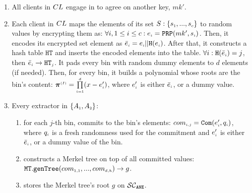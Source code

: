 \begin{enumerate}
\item\label{e-psi::gen-mk-prime} All clients in ${CL}$ engage in \ct to agree on another key, $mk'$.
%
\item\label{Smart-PSI:encode-elem} Each client  in ${CL}$ maps the elements of its set $S:\{ s_{\scriptscriptstyle 1},..., s_{\scriptscriptstyle c}\}$ to random values by encrypting them as: $\forall i, 1\leq i\leq c: e_{\scriptscriptstyle i}=\mathtt{PRP}(mk', s_{\scriptscriptstyle i})$. 
%
Then, it encodes its encrypted set element as $\bar{e}_{\scriptscriptstyle i} =e_{\scriptscriptstyle i} || \mathtt{H}(e_{\scriptscriptstyle i})$.  
%
After that, it constructs a hash table  $\mathtt{HT}$ and inserts the encoded elements into the table. $\forall i: \mathtt{H}( \bar{e}_{\scriptscriptstyle i})={ {  {j}}}$, then $\bar{e}_{\scriptscriptstyle i}\rightarrow \mathtt{HT}_{\scriptscriptstyle {  {j}}}$. It pads every bin with random dummy elements to $d$ elements (if needed). Then,  for every bin, it builds a polynomial whose roots are the bin's content: $\bm\pi^{\scriptscriptstyle { {(I)}}}=\prod\limits^{\scriptscriptstyle d}_{\scriptscriptstyle i=1} (x-e'_{\scriptscriptstyle i})$, where $e'_{\scriptscriptstyle i}$ is either $\bar{e}_{\scriptscriptstyle i}$, or a dummy value. 




\item\label{merkel-tree-cons} Every extractor in $\{A_{\scriptscriptstyle 1}, A_{\scriptscriptstyle 2}\}$: 

\begin{enumerate}
%
%
\item\label{smart-PSI::commit-to-bin} for each $j$-th bin, commits to the bin's elements: $com_{\scriptscriptstyle{i,j}}=\mathtt{Com}(e'_{\scriptscriptstyle i}, q_{\scriptscriptstyle i})$, where $q_{\scriptscriptstyle i}$ is a fresh randomness  used for the commitment and $e'_{\scriptscriptstyle i}$ is either $\bar{e}_{\scriptscriptstyle i}$, or a dummy value of the bin. %




\item  constructs a Merkel tree on top of all committed values: $\mathtt{MT.genTree}(com_{\scriptscriptstyle 1,1},...,com_{\scriptscriptstyle d,h})\rightarrow g$. %
\item stores the Merkel tree's root $g$ on $\mathcal{SC}_{\mathtt{ANE}}$.
\end{enumerate}



\end{enumerate}
